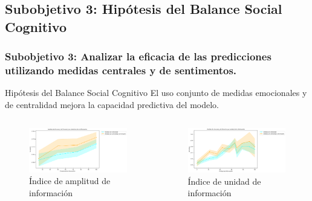 \documentclass{beamer}
\begin{document}
\subsection{Subobjetivo 3: Hipótesis del Balance Social Cognitivo}
\begin{frame}
	\frametitle{Subobjetivo 3: Analizar la eficacia de las predicciones utilizando medidas centrales y de sentimentos.}
	\begin{block}{Hipótesis del Balance Social Cognitivo}
	El uso conjunto de medidas emocionales y de centralidad mejora la capacidad predictiva del modelo.
	\end{block}


			\begin{columns}[c]
		\begin{column}{.5\textwidth}
			\begin{figure}
				\centering
				\includegraphics[width=1\textwidth]{figs/cap7/figura_53}
\caption{Índice de amplitud de información}
			\end{figure}      
		\end{column}
		\begin{column}{.5\textwidth}
			\begin{figure}
				\centering
\includegraphics[width=1\textwidth]{figs/cap7/figura_54}
\caption{Índice de unidad de información}
			\end{figure}
		\end{column}
	\end{columns}
	
\end{frame}
\end{document}
